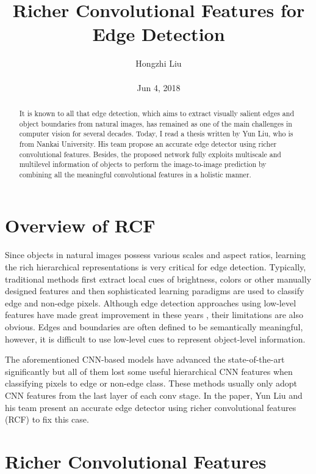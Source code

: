 \documentclass[10pt,twocolumn,letterpaper]{article}
\title{Richer Convolutional Features for Edge Detection}
\author{Hongzhi Liu\\\\
Jun 4, 2018}
\begin{document}
\maketitle
\begin{abstract}
	It is known to all that edge detection, which aims to extract visually salient edges and object boundaries from natural images, has remained as one of the main challenges in computer vision for several decades. Today, I read a thesis written by Yun Liu, who is from Nankai University. His team propose an accurate edge detector using richer convolutional features. Besides, the proposed network fully exploits multiscale and multilevel information of objects to perform the image-to-image prediction by combining all the meaningful convolutional features in a holistic manner.
\end{abstract}
\section{Overview of RCF}
Since objects in natural images possess various scales and aspect ratios, learning the rich hierarchical representations is very critical for edge detection. Typically, traditional methods first extract local cues of brightness, colors or other manually designed features and then sophisticated learning paradigms \cite{dollar2015fast} are used to classify edge and non-edge pixels. Although edge detection approaches using low-level features have made great improvement in these years \cite{leordeanu2014generalized}, their limitations are also obvious. Edges and boundaries are often defined to be semantically meaningful, however, it is difficult to use low-level cues to represent object-level information.

The aforementioned CNN-based models have advanced the state-of-the-art significantly but all of them lost some useful hierarchical CNN features when classifying pixels to edge or non-edge class. These methods usually only adopt CNN features from the last layer of each conv stage. In the paper, Yun Liu and his team present an accurate edge detector using richer convolutional features (RCF) \cite{liu2017richer} to fix this case.

\section{Richer Convolutional Features}
\end{document}
